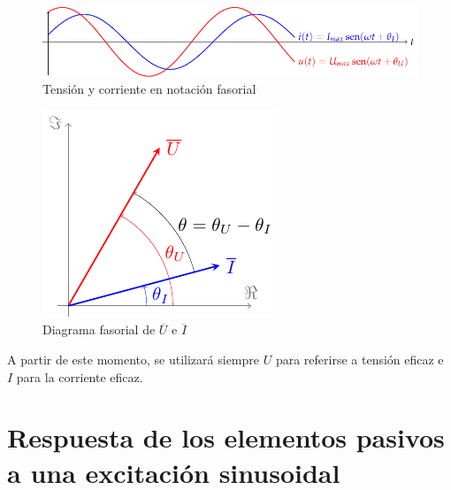 \begin{figure}[H]
  \centering
  \includegraphics[width=.9\linewidth]{../figs/ondasTensionCorriente.pdf}
  \caption{Tensión y corriente en notación fasorial}
  \label{fig.ondasTensionCorriente}
\end{figure}
	
	
\begin{figure}[H]
  \centering
  \includegraphics[width=0.3\linewidth]{../figs/fasorTensionCorriente.pdf}
  \caption{Diagrama fasorial de $\overline{U}$ e $\overline{I}$}
  \label{fig.fasortensioncorriente}
\end{figure}
	
\begin{remark}
  A partir de este momento, se utilizará siempre $U$ para referirse a
  tensión eficaz e $I$ para la corriente eficaz.
\end{remark}
	
\section{Respuesta de los elementos pasivos a una excitación
  sinusoidal}
	
